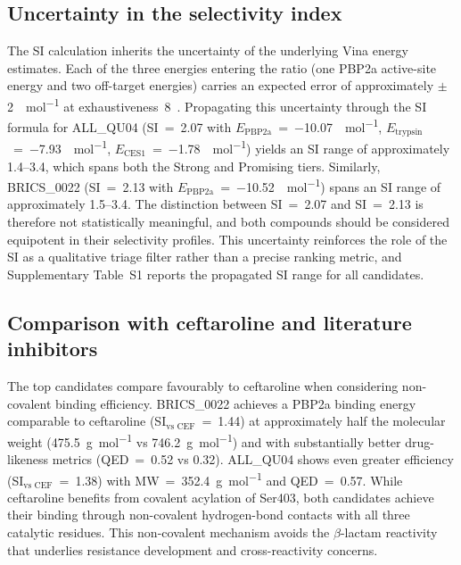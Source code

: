 \documentclass[12pt]{article}
\begin{document}
\subsection{Uncertainty in the selectivity index}
The SI calculation inherits the uncertainty of the underlying Vina energy estimates. Each of the three energies entering the ratio (one PBP2a active-site energy and two off-target energies) carries an expected error of approximately $\pm$\SI{2}{\kcal\per\mol} at exhaustiveness~8~\cite{trott2010}. Propagating this uncertainty through the SI formula for ALL\_QU04 (SI~=~2.07 with $E_{\text{PBP2a}}$~=~\SI{-10.07}{\kcal\per\mol}, $E_{\text{trypsin}}$~=~\SI{-7.93}{\kcal\per\mol}, $E_{\text{CES1}}$~=~\SI{-1.78}{\kcal\per\mol}) yields an SI range of approximately 1.4--3.4, which spans both the Strong and Promising tiers. Similarly, BRICS\_0022 (SI~=~2.13 with $E_{\text{PBP2a}}$~=~\SI{-10.52}{\kcal\per\mol}) spans an SI range of approximately 1.5--3.4. The distinction between SI~=~2.07 and SI~=~2.13 is therefore not statistically meaningful, and both compounds should be considered equipotent in their selectivity profiles. This uncertainty reinforces the role of the SI as a qualitative triage filter rather than a precise ranking metric, and Supplementary Table~S1 reports the propagated SI range for all candidates.

\subsection{Comparison with ceftaroline and literature inhibitors}
The top candidates compare favourably to ceftaroline when considering non-covalent binding efficiency. BRICS\_0022 achieves a PBP2a binding energy comparable to ceftaroline (SI$_{\text{vs CEF}}$~=~1.44) at approximately half the molecular weight (\SI{475.5}{\g\per\mol} vs \SI{746.2}{\g\per\mol}) and with substantially better drug-likeness metrics (QED~=~0.52 vs 0.32). ALL\_QU04 shows even greater efficiency (SI$_{\text{vs CEF}}$~=~1.38) with MW~=~\SI{352.4}{\g\per\mol} and QED~=~0.57. While ceftaroline benefits from covalent acylation of Ser403, both candidates achieve their binding through non-covalent hydrogen-bond contacts with all three catalytic residues. This non-covalent mechanism avoids the $\beta$-lactam reactivity that underlies resistance development and cross-reactivity concerns.
\end{document}
